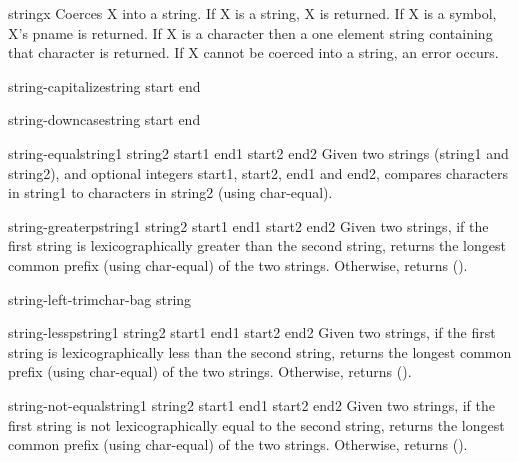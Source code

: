 \begin{function}{string}{x}{}{}
  Coerces X into a string. If X is a string, X is returned. If X is a
   symbol, X's pname is returned. If X is a character then a one element
   string containing that character is returned. If X cannot be coerced
   into a string, an error occurs.
\end{function}

\begin{function}{string-capitalize}{string \key start end}{}{}
  
\end{function}

\begin{function}{string-downcase}{string \key start end}{}{}
  
\end{function}

\begin{function}{string-equal}{string1 string2 \key start1 end1 start2 end2}{}{}
  Given two strings (string1 and string2), and optional integers start1,
  start2, end1 and end2, compares characters in string1 to characters in
  string2 (using char-equal).
\end{function}

\begin{function}{string-greaterp}{string1 string2 \key start1 end1 start2 end2}{}{}
  Given two strings, if the first string is lexicographically greater than
  the second string, returns the longest common prefix (using char-equal)
  of the two strings. Otherwise, returns ().
\end{function}

\begin{function}{string-left-trim}{char-bag string}{}{}
  
\end{function}

\begin{function}{string-lessp}{string1 string2 \key start1 end1 start2 end2}{}{}
  Given two strings, if the first string is lexicographically less than
  the second string, returns the longest common prefix (using char-equal)
  of the two strings. Otherwise, returns ().
\end{function}

\begin{function}{string-not-equal}{string1 string2 \key start1 end1 start2 end2}{}{}
  Given two strings, if the first string is not lexicographically equal
  to the second string, returns the longest common prefix (using char-equal)
  of the two strings. Otherwise, returns ().
\end{function}

